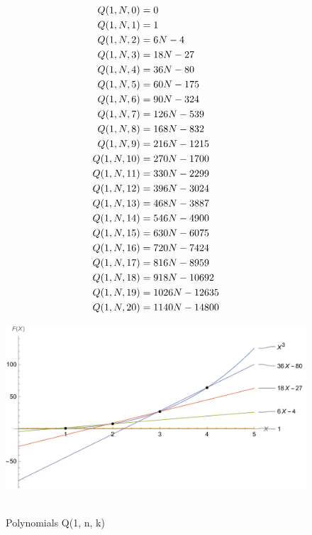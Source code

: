 ﻿\begin{align*}
    {Q}(1,N,0) &= 0 \\
    {Q}(1,N,1) &= 1 \\
    {Q}(1,N,2) &= 6N - 4 \\
    {Q}(1,N,3) &= 18N - 27 \\
    {Q}(1,N,4) &= 36N - 80 \\
    {Q}(1,N,5) &= 60N - 175 \\
    {Q}(1,N,6) &= 90N - 324 \\
    {Q}(1,N,7) &= 126N - 539 \\
    {Q}(1,N,8) &= 168N - 832 \\
    {Q}(1,N,9) &= 216N - 1215 \\
    {Q}(1,N,10) &= 270N - 1700 \\
    {Q}(1,N,11) &= 330N - 2299 \\
    {Q}(1,N,12) &= 396N - 3024 \\
    {Q}(1,N,13) &= 468N - 3887 \\
    {Q}(1,N,14) &= 546N - 4900 \\
    {Q}(1,N,15) &= 630N - 6075 \\
    {Q}(1,N,16) &= 720N - 7424 \\
    {Q}(1,N,17) &= 816N - 8959 \\
    {Q}(1,N,18) &= 918N - 10692 \\
    {Q}(1,N,19) &= 1026N - 12635 \\
    {Q}(1,N,20) &= 1140N - 14800
\end{align*}
\begin{figure}[H]
    \centering
    \includegraphics[width=1\textwidth]{sections/images/02_cubes_with_q_1_n_k}
    ~\caption{Polynomials Q(1, n, k)}\label{fig:figure2}
\end{figure}

